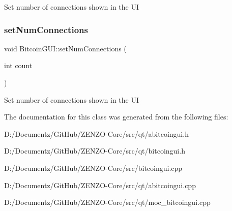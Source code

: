 Set number of connections shown in the UI \mbox{\label{class_bitcoin_g_u_i_ae5b9dc62c6a52764a92cfacbe128626f}} 
\subsubsection{\texorpdfstring{setNumConnections}{setNumConnections}\hspace{0.1cm}{\footnotesize\ttfamily [2/2]}}
{\footnotesize\ttfamily void Bitcoin\+G\+U\+I\+::set\+Num\+Connections (\begin{DoxyParamCaption}\item[{int}]{count }\end{DoxyParamCaption})\hspace{0.3cm}{\ttfamily [slot]}}

Set number of connections shown in the UI 

The documentation for this class was generated from the following files\+:\begin{DoxyCompactItemize}
\item 
D\+:/\+Documentz/\+Git\+Hub/\+Z\+E\+N\+Z\+O-\/\+Core/src/qt/abitcoingui.\+h\item 
D\+:/\+Documentz/\+Git\+Hub/\+Z\+E\+N\+Z\+O-\/\+Core/src/qt/bitcoingui.\+h\item 
D\+:/\+Documentz/\+Git\+Hub/\+Z\+E\+N\+Z\+O-\/\+Core/src/bitcoingui.\+cpp\item 
D\+:/\+Documentz/\+Git\+Hub/\+Z\+E\+N\+Z\+O-\/\+Core/src/qt/abitcoingui.\+cpp\item 
D\+:/\+Documentz/\+Git\+Hub/\+Z\+E\+N\+Z\+O-\/\+Core/src/qt/moc\+\_\+bitcoingui.\+cpp\end{DoxyCompactItemize}
